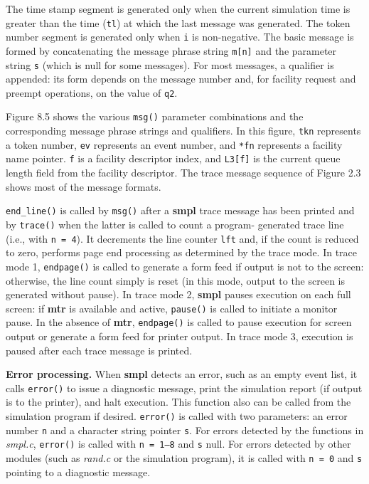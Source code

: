 The time stamp segment is generated only when the current simulation time
is greater than the time (\texttt{tl}) at which the last message was generated. The
token number segment is generated only when \texttt{i} is non-negative. The basic
message is formed by concatenating the message phrase string \texttt{m[n]} and the
parameter string \texttt{s} (which is null for some messages). For most messages, a
qualifier is appended: its form depends on the message number and, for
facility request and preempt operations, on the value of \texttt{q2}.

Figure 8.5 shows the various \texttt{msg()} parameter combinations and the
corresponding message phrase strings and qualifiers. In this figure, \texttt{tkn}
represents a token number, \texttt{ev} represents an event number, and \texttt{*fn} represents
a facility name pointer. \texttt{f} is a facility descriptor index, and \texttt{L3[f]} is the
current queue length field from the facility descriptor. The trace message
sequence of Figure 2.3 shows most of the message formats.

\texttt{end\_line()} is called by \texttt{msg()} after a \textbf{smpl} trace message has been
printed and by \texttt{trace()} when the latter is called to count a program-
generated trace line (i.e., with \texttt{n = 4}). It decrements the line counter \texttt{lft}
and, if the count is reduced to zero, performs page end processing as determined
by the trace mode. In trace mode 1, \texttt{endpage()} is called to generate a
form feed if output is not to the screen: otherwise, the line count simply is
reset (in this mode, output to the screen is generated without pause). In trace
mode 2, \textbf{smpl} pauses execution on each full screen: if \textbf{mtr} is available and
active, \texttt{pause()} is called to initiate a monitor pause. In the absence of \textbf{mtr},
\texttt{endpage()} is called to pause execution for screen output or generate a form
feed for printer output. In trace mode 3, execution is paused after each trace
message is printed.

\textbf{Error processing.} When \textbf{smpl} detects an error, such as an empty event list,
it calls \texttt{error()} to issue a diagnostic message, print the simulation report (if
output is to the printer), and halt execution. This function also can be called
from the simulation program if desired. \texttt{error()} is called with two parameters:
an error number \texttt{n} and a character string pointer \texttt{s}. For errors detected
by the functions in \textit{smpl.c}, \texttt{error()} is called with \texttt{n = 1--8} and \texttt{s} null. For
errors detected by other modules (such as \textit{rand.c} or the simulation program),
it is called with \texttt{n = 0} and \texttt{s} pointing to a diagnostic message.

